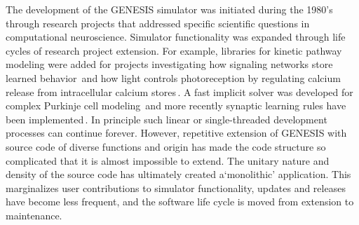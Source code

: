 \documentclass[10pt]{article}
\begin{document}
The development of the GENESIS simulator was initiated during
the 1980's through research projects that addressed specific
scientific questions in computational neuroscience. Simulator functionality was
expanded through life cycles of research project extension.
For example, libraries for kinetic pathway modeling were added for
projects investigating how signaling networks store learned
behavior\,\cite{bhalla99:_emerg} and how light controls photoreception by regulating calcium release from
intracellular calcium stores\,\cite{blackwell00:_eviden_distin_light_induc_calcium}.
A fast implicit solver was developed for
complex Purkinje cell modeling\,\cite{deschutter94:_purkin_i,
  deschutter94:_purkin_ii} and more recently synaptic learning rules
have been
implemented\,\cite{guenay08:_chann_densit_distr_explain_spikin}.  In
principle such linear or single-threaded development processes can
continue forever.  However, repetitive extension of GENESIS
with source code of diverse functions and origin has
made the code structure so complicated that it is almost impossible to extend.  The unitary nature and density of
the source code has ultimately created a`monolithic' application.
This marginalizes user contributions to simulator functionality, updates and releases have become less frequent,
and the software life cycle is moved from extension to maintenance.

\end{document}
